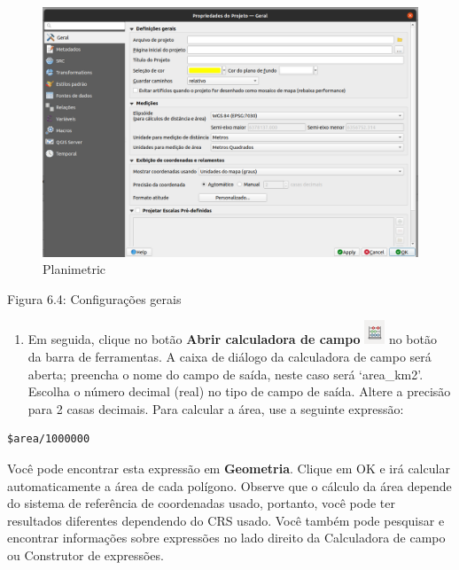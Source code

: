 \documentclass[
]{krantz}
\providecommand{\tightlist}{%
  \setlength{\itemsep}{0pt}\setlength{\parskip}{0pt}}
\begin{document}
\begin{figure}
\centering
\includegraphics{media/modulo6/gen-settings.png}
\caption{Planimetric}
\end{figure}

Figura 6.4: Configurações gerais

\begin{enumerate}
\def\labelenumi{\arabic{enumi}.}
\setcounter{enumi}{4}
\tightlist
\item
  Em seguida, clique no botão \textbf{Abrir calculadora de campo} \includegraphics{media/modulo6/field_calculator.png} no botão da barra de ferramentas. A caixa de diálogo da calculadora de campo será aberta; preencha o nome do campo de saída, neste caso será `area\_km2'. Escolha o número decimal (real) no tipo de campo de saída. Altere a precisão para 2 casas decimais. Para calcular a área, use a seguinte expressão:
\end{enumerate}

\begin{verbatim}
$area/1000000
\end{verbatim}

Você pode encontrar esta expressão em \textbf{Geometria}. Clique em OK e irá calcular automaticamente a área de cada polígono. Observe que o cálculo da área depende do sistema de referência de coordenadas usado, portanto, você pode ter resultados diferentes dependendo do CRS usado. Você também pode pesquisar e encontrar informações sobre expressões no lado direito da Calculadora de campo ou Construtor de expressões.
\end{document}
